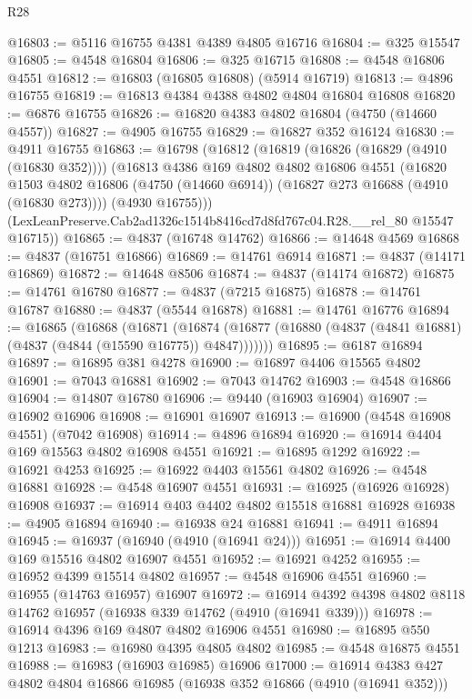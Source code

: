 \begin{lexlean}{R28}
\begin{coremodule}
@16803 := @5116 @16755 @4381 @4389 @4805 @16716
@16804 := @325 @15547
@16805 := @4548 @16804
@16806 := @325 @16715
@16808 := @4548 @16806 @4551
@16812 := @16803 (@16805 @16808) (@5914 @16719)
@16813 := @4896 @16755
@16819 := @16813 @4384 @4388 @4802 @4804 @16804 @16808
@16820 := @6876 @16755
@16826 := @16820 @4383 @4802 @16804 (@4750 (@14660 @4557))
@16827 := @4905 @16755
@16829 := @16827 @352 @16124
@16830 := @4911 @16755
@16863 := @16798
    (@16812
      (@16819
        (@16826 (@16829 (@4910 (@16830 @352))))
        (@16813
          @4386
          @169
          @4802
          @4802
          @16806
          @4551
          (@16820
            @1503
            @4802
            @16806
            (@4750 (@14660 @6914))
            (@16827 @273 @16688 (@4910 (@16830 @273))))
          (@4930 @16755)))
      (LexLeanPreserve.Cab2ad1326c1514b8416cd7d8fd767c04.R28.__rel_80 @15547 @16715))
@16865 := @4837 (@16748 @14762)
@16866 := @14648 @4569
@16868 := @4837 (@16751 @16866)
@16869 := @14761 @6914
@16871 := @4837 (@14171 @16869)
@16872 := @14648 @8506
@16874 := @4837 (@14174 @16872)
@16875 := @14761 @16780
@16877 := @4837 (@7215 @16875)
@16878 := @14761 @16787
@16880 := @4837 (@5544 @16878)
@16881 := @14761 @16776
@16894 := @16865
    (@16868
      (@16871
        (@16874 (@16877 (@16880 (@4837 (@4841 @16881) (@4837 (@4844 (@15590 @16775)) @4847)))))))
@16895 := @6187 @16894
@16897 := @16895 @381 @4278
@16900 := @16897 @4406 @15565 @4802
@16901 := @7043 @16881
@16902 := @7043 @14762
@16903 := @4548 @16866
@16904 := @14807 @16780
@16906 := @9440 (@16903 @16904)
@16907 := @16902 @16906
@16908 := @16901 @16907
@16913 := @16900 (@4548 @16908 @4551) (@7042 @16908)
@16914 := @4896 @16894
@16920 := @16914 @4404 @169 @15563 @4802 @16908 @4551
@16921 := @16895 @1292
@16922 := @16921 @4253
@16925 := @16922 @4403 @15561 @4802
@16926 := @4548 @16881
@16928 := @4548 @16907 @4551
@16931 := @16925 (@16926 @16928) @16908
@16937 := @16914 @403 @4402 @4802 @15518 @16881 @16928
@16938 := @4905 @16894
@16940 := @16938 @24 @16881
@16941 := @4911 @16894
@16945 := @16937 (@16940 (@4910 (@16941 @24)))
@16951 := @16914 @4400 @169 @15516 @4802 @16907 @4551
@16952 := @16921 @4252
@16955 := @16952 @4399 @15514 @4802
@16957 := @4548 @16906 @4551
@16960 := @16955 (@14763 @16957) @16907
@16972 := @16914 @4392 @4398 @4802 @8118 @14762 @16957 (@16938 @339 @14762 (@4910 (@16941 @339)))
@16978 := @16914 @4396 @169 @4807 @4802 @16906 @4551
@16980 := @16895 @550 @1213
@16983 := @16980 @4395 @4805 @4802
@16985 := @4548 @16875 @4551
@16988 := @16983 (@16903 @16985) @16906
@17000 := @16914 @4383 @427 @4802 @4804 @16866 @16985 (@16938 @352 @16866 (@4910 (@16941 @352)))

\end{coremodule}
\end{lexlean}
